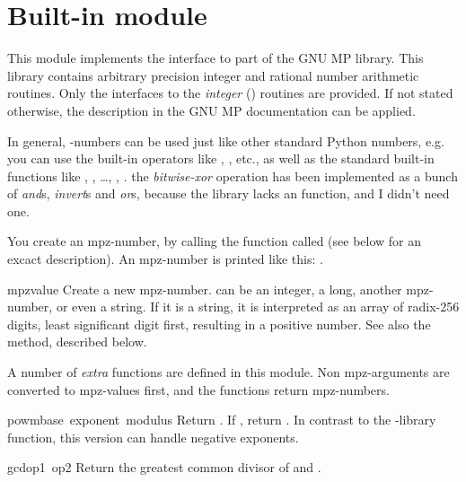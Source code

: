 \section{Built-in module }

This module implements the interface to part of the GNU MP library.
This library contains arbitrary precision integer and rational number
arithmetic routines. Only the interfaces to the \emph{integer}
() routines are provided. If not stated
otherwise, the description in the GNU MP documentation can be applied.

In general, -numbers can be used just like other standard
Python numbers, e.g. you can use the built-in operators like \code{+},
\code{*}, etc., as well as the standard built-in functions like
, , \ldots, , .
 the {\it bitwise-xor} operation has been implemented as
a bunch of {\it and}s, {\it invert}s and {\it or}s, because the library
lacks an  function, and I didn't need one.

You create an mpz-number, by calling the function called  (see
below for an excact description). An mpz-number is printed like this:
.

\renewcommand{\indexsubitem}{(in module mpz)}
\begin{funcdesc}{mpz}{value}
  Create a new mpz-number.  can be an integer, a long,
  another mpz-number, or even a string. If it is a string, it is
  interpreted as an array of radix-256 digits, least significant digit
  first, resulting in a positive number. See also the 
  method, described below.
\end{funcdesc}

A number of {\em extra} functions are defined in this module. Non
mpz-arguments are converted to mpz-values first, and the functions
return mpz-numbers.

\begin{funcdesc}{powm}{base\, exponent\, modulus}
  Return . If
  , return . In contrast to the
  \C-library function, this version can handle negative exponents.
\end{funcdesc}

\begin{funcdesc}{gcd}{op1\, op2}
  Return the greatest common divisor of  and .
\end{funcdesc}

